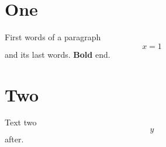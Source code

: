 \documentclass{article}
\begin{document}
\section{One}
First words of a paragraph
\[ x = 1 \]
and its last words.
\textbf{Bold} end.
\section{Two}
Text two \[ y \] after.
\end{document}
